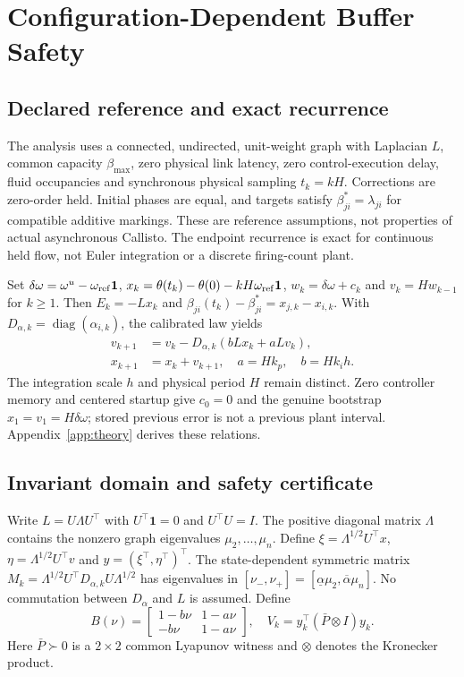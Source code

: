 \section{Configuration-Dependent Buffer Safety}
\label{sec:btd_reference}

\subsection{Declared reference and exact recurrence}
The analysis uses a connected, undirected, unit-weight graph with
Laplacian $L$, common capacity $\beta_{\max}$, zero physical link latency, zero
control-execution delay, fluid
occupancies and synchronous physical sampling $t_k=kH$. Corrections
are zero-order held. Initial phases are equal, and targets satisfy
$\beta^*_{ji}=\lambda_{ji}$ for compatible additive markings. These
are reference assumptions, not properties of actual asynchronous
Callisto. The endpoint recurrence is exact for continuous held flow,
not Euler integration or a discrete firing-count plant.

Set $\delta\omega=\omega^u-\omega_{\rm ref}\mathbf1$,
$x_k=\theta(t_k)-\theta(0)-kH\omega_{\rm ref}\mathbf1$,
$w_k=\delta\omega+c_k$ and $v_k=Hw_{k-1}$ for $k\ge1$.
Then $E_k=-Lx_k$ and $\beta_{ji}(t_k)-\beta^*_{ji}=x_{j,k}-x_{i,k}$.
With $D_{\alpha,k}=\operatorname{diag}(\alpha_{i,k})$, the calibrated
law yields
\begin{align}
 v_{k+1}&=v_k-D_{\alpha,k}(bLx_k+aLv_k),\nonumber\\
 x_{k+1}&=x_k+v_{k+1},\quad a=Hk_p,\quad b=Hk_ih.
 \label{eq:btd_full_recurrence}
\end{align}
The integration scale $h$ and physical period $H$ remain distinct.
Zero controller memory and centered startup give $c_0=0$ and the
genuine bootstrap $x_1=v_1=H\delta\omega$; stored previous error is
not a previous plant interval. Appendix~\ref{app:theory} derives these relations.

\subsection{Invariant domain and safety certificate}
Write $L=U\Lambda U^\top$ with $U^\top\mathbf1=0$ and
$U^\top U=I$. The positive diagonal matrix $\Lambda$ contains
the nonzero graph eigenvalues $\mu_2,\ldots,\mu_n$.
Define $\xi=\Lambda^{1/2}U^\top x$, $\eta=\Lambda^{1/2}U^\top v$
and $y=(\xi^\top,\eta^\top)^\top$. The state-dependent symmetric
matrix $M_k=\Lambda^{1/2}U^\top D_{\alpha,k}U\Lambda^{1/2}$ has
eigenvalues in $[\nu_-,\nu_+]=[\underline\alpha\mu_2,
\overline\alpha\mu_n]$. No commutation between $D_\alpha$ and $L$
is assumed. Define
\begin{equation}
 B(\nu)=\begin{bmatrix}1-b\nu&1-a\nu\\-b\nu&1-a\nu\end{bmatrix},
 \quad V_k=y_k^\top(\bar P\otimes I)y_k.
\end{equation}
Here $\bar P\succ0$ is a $2\times2$ common Lyapunov witness and
$\otimes$ denotes the Kronecker product.

